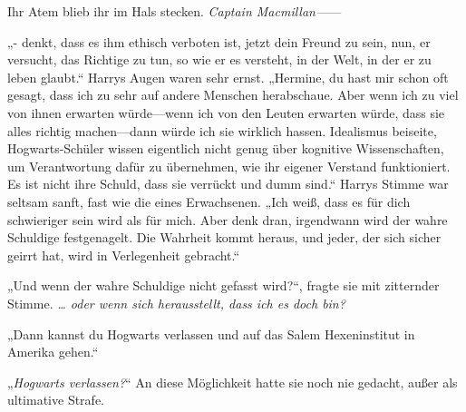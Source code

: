 Ihr Atem blieb ihr im Hals stecken. \emph{Captain Macmillan—}—

„- denkt, dass es ihm ethisch verboten ist, jetzt dein Freund zu sein, nun, er versucht, das Richtige zu tun, so wie er es versteht, in der Welt, in der er zu leben glaubt.“
Harrys Augen waren sehr ernst. „Hermine, du hast mir schon oft gesagt, dass ich zu sehr auf andere Menschen herabschaue. Aber wenn ich zu viel von ihnen erwarten würde—wenn ich von den Leuten erwarten würde, dass sie alles richtig machen—dann würde ich sie wirklich hassen. Idealismus beiseite, Hogwarts-Schüler wissen eigentlich nicht genug über kognitive Wissenschaften, um Verantwortung dafür zu übernehmen, wie ihr eigener Verstand funktioniert. Es ist nicht ihre Schuld, dass sie verrückt und dumm sind.“
Harrys Stimme war seltsam sanft, fast wie die eines Erwachsenen.
„Ich weiß, dass es für dich schwieriger sein wird als für mich. Aber denk dran, irgendwann wird der wahre Schuldige festgenagelt. Die Wahrheit kommt heraus, und jeder, der sich sicher geirrt hat, wird in Verlegenheit gebracht.“


„Und wenn der wahre Schuldige nicht gefasst wird?“, fragte sie mit zitternder Stimme. \emph{… oder wenn sich herausstellt, dass ich es doch bin?}

„Dann kannst du Hogwarts verlassen und auf das Salem Hexeninstitut in Amerika gehen.“

„\emph{Hogwarts verlassen?}“ An diese Möglichkeit hatte sie noch nie gedacht, außer als ultimative Strafe.

